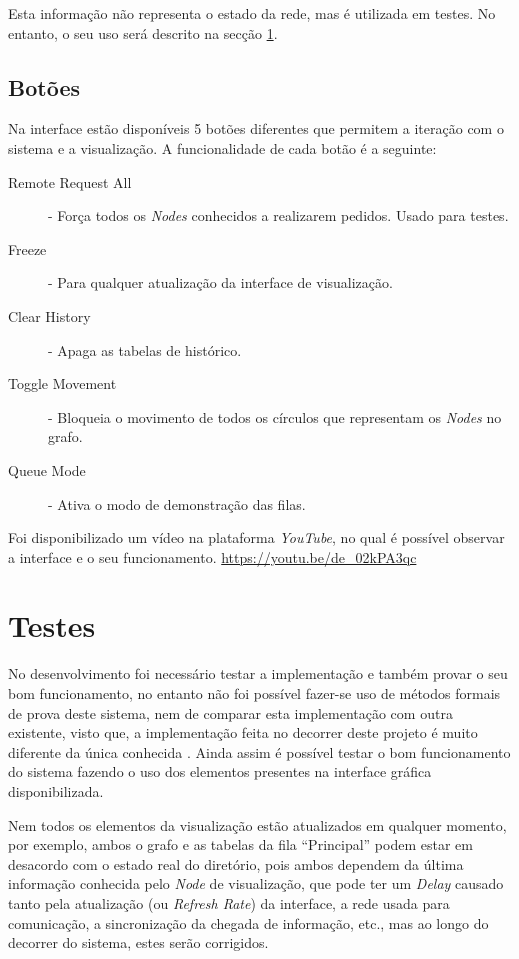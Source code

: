 Esta informação não representa o estado da rede, mas é utilizada em testes. No entanto, o seu uso será descrito na secção \ref{validacao:sec:testes}.

\subsection*{Botões}
Na interface estão disponíveis 5 botões diferentes que permitem a iteração com o sistema e a visualização. A funcionalidade de cada botão é a seguinte:
\begin{description}
    \item [Remote Request All] - Força todos os \emph{Nodes} conhecidos a realizarem pedidos. Usado para testes.
    \item [Freeze] - Para qualquer atualização da interface de visualização.
    \item [Clear History] - Apaga as tabelas de histórico.
    \item [Toggle Movement] - Bloqueia o movimento de todos os círculos que representam os \emph{Nodes} no grafo.
    \item [Queue Mode] - Ativa o modo de demonstração das filas.

\end{description}

Foi disponibilizado um vídeo na plataforma \emph{YouTube}, no qual é possível observar a interface e o seu funcionamento. \url{https://youtu.be/de_02kPA3qc}
\section{Testes}
\label{validacao:sec:testes}
No desenvolvimento foi necessário testar a implementação e também provar o seu bom funcionamento, no entanto não foi possível fazer-se uso de métodos formais de prova deste sistema, nem de comparar esta implementação com outra existente, visto que, a implementação feita no decorrer deste projeto é muito diferente da única conhecida \cite{aleph}.
Ainda assim é possível testar o bom funcionamento do sistema fazendo o uso dos elementos presentes na interface gráfica disponibilizada.

Nem todos os elementos da visualização estão atualizados em qualquer momento, por exemplo, ambos o grafo e as tabelas da fila ``Principal'' podem estar em desacordo com o estado real do diretório, pois ambos dependem da última informação conhecida pelo \emph{Node} de visualização, que pode ter um \emph{Delay} causado tanto pela atualização (ou \emph{Refresh Rate}) da interface, a rede usada para comunicação, a sincronização da chegada de informação, etc., mas ao longo do decorrer do sistema, estes serão corrigidos.


